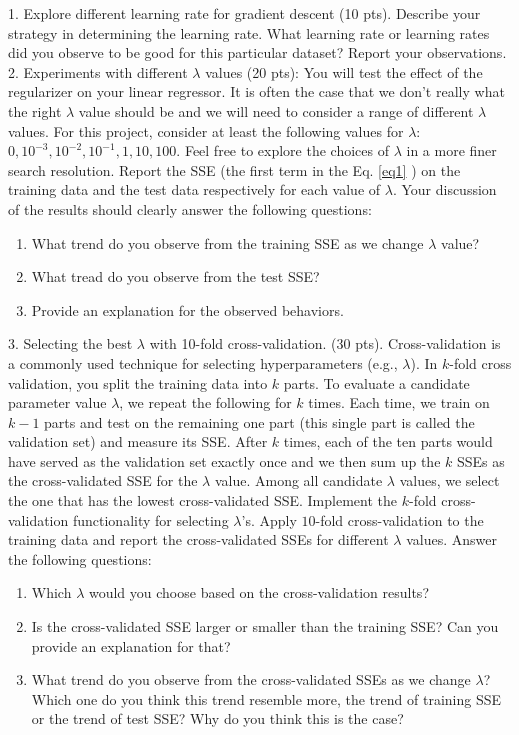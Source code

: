 \documentclass{article}
\begin{document}
1. Explore different learning rate for gradient descent (10 pts). Describe your strategy in determining the learning rate. What learning rate or learning rates did you observe to be good for this particular dataset? Report your observations.\\

2. Experiments with different $\lambda$ values (20 pts):  You will test the effect of the regularizer on your linear regressor. It is often the case that we don't really what the right $\lambda$ value should be and we will need to consider a range of different $\lambda$ values. For this project, consider at least the following values for $\lambda$: $0, 10^{-3}, 10^{-2}, 10^{-1}, 1, 10, 100$. Feel free to explore the choices of $\lambda$ in a more finer search resolution. Report the SSE (the first term in the Eq. \ref{eq1} ) on the training data and the test data respectively for each value of $\lambda$. Your discussion of the results should clearly answer the following questions:
\begin{enumerate}
\item What trend do you observe from the training SSE as we change $\lambda$ value?
\item What tread do you observe from the test SSE?
\item Provide an explanation for the observed behaviors.
\end{enumerate}

3. Selecting the best $\lambda$ with 10-fold cross-validation. (30 pts). Cross-validation is a commonly used technique for selecting hyperparameters (e.g., $\lambda$).  In $k$-fold cross validation, you split the training data into $k$ parts. To evaluate a candidate parameter value $\lambda$,  we repeat the following for $k$ times. Each time, we train on $k-1$ parts and test on the remaining one part (this single part is called the validation set) and measure its SSE. After $k$ times, each of the ten parts would have served as the validation set exactly once and we then sum up the $k$ SSEs as the cross-validated SSE for the $\lambda$ value.  Among all candidate $\lambda$ values, we select the one that has the lowest cross-validated SSE. Implement the $k$-fold cross-validation functionality for selecting $\lambda$'s.  Apply $10$-fold cross-validation to the training data and report the cross-validated SSEs for different $\lambda$ values. Answer the following questions:
\begin{enumerate}
\item Which $\lambda$ would you choose based on the cross-validation results?
\item Is the cross-validated SSE larger or smaller than the training SSE? Can you provide an explanation for that?
\item What trend do you observe from the cross-validated SSEs as we change $\lambda$? Which one do you think this trend resemble more, the trend of training SSE or the trend of test SSE? Why do you think this is the case?
\end{enumerate}
\end{document}
